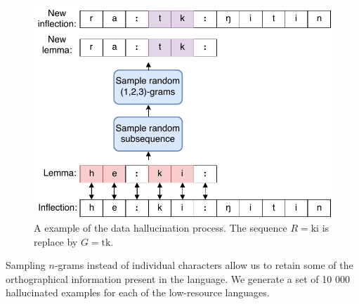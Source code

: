 \documentclass[11pt,a4paper]{article}
\begin{document}
\begin{figure}[h]
\centering
\includegraphics[scale=0.5]{hall.pdf}
\caption{\label{fig:hall} A example of the data hallucination process. The sequence $R=\text{ki}$ is replace by $G=\text{tk}$.}
\end{figure}


Sampling $n$-grams instead of individual characters allow us to retain
some of the orthographical information present in the language.  We
generate a set of 10 000 hallucinated examples for each of the
low-resource languages.


\end{document}
